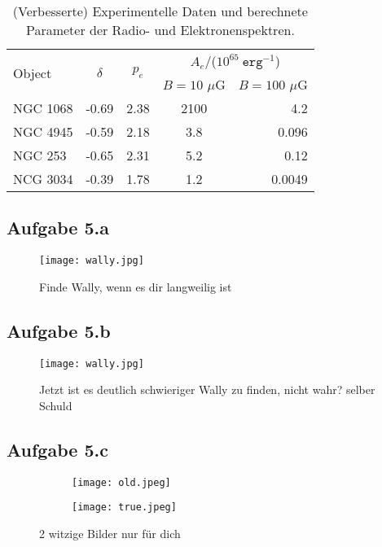 \documentclass[11pt,
               a4paper,
               parskip=half,
               ]{scrartcl}
\newcommand{\textsw}[1]{\texttt{#1}} %
\begin{document}
\begin{table}[h]
\centering
\begin{tabular}{lcccr}
\hline
\multirow{2}{*}{Object}
& \multirow{2}{*}{$\delta$}
& \multirow{2}{*}{$p_e$}
& \multicolumn{2}{c}{$A_e$/($10^{65} \ \textsw{erg}^{-1}$)  }\\
\cline{4-5}

&&& $B = \SI{10}$ ${\mu}$G
&  $B = 100$  $\mu$G
\\
\hline
NGC 1068 & -0.69 & 2.38 & 2100 & 4.2\\
NGC 4945 & -0.59 & 2.18 & 3.8 & 0.096\\
NGC 253 & -0.65 & 2.31 & 5.2 & 0.12 \\
NCG 3034 & -0.39 & 1.78 & 1.2 & 0.0049\\\hline

\end{tabular}
\caption{(Verbesserte) Experimentelle Daten und berechnete Parameter der Radio- und Elektronenspektren.}
\end{table}


\subsection{Aufgabe 5.a }

\begin{figure}[h]
    \centering
    \texttt{[image: wally.jpg]}
    \caption{Finde Wally, wenn es dir langweilig ist}
    \label{fig:my_label}
\end{figure}
\newpage
\subsection{Aufgabe 5.b}

\begin{figure}[h]
    \centering
    \texttt{[image: wally.jpg]}
    \caption{Jetzt ist es deutlich schwieriger Wally zu finden, nicht wahr? selber Schuld}
    \label{fig:my_label}
\end{figure}
\newpage
\subsection{Aufgabe 5.c}

\begin{figure}[h]
\begin{subfigure}[c]{0.45\linewidth}
\centering
\texttt{[image: old.jpeg]}
\end{subfigure}
\hfill
\begin{subfigure}[c]{0.45\linewidth}
\centering
\texttt{[image: true.jpeg]}
\end{subfigure}
\caption{2 witzige Bilder nur für dich}
\end{figure}
\end{document}
